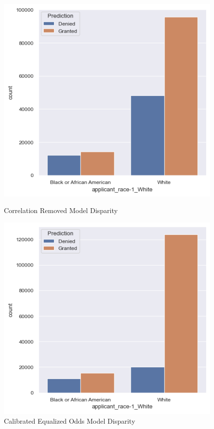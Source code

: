 \begin{figure}[h]
    \vspace{1em} %
    
    \begin{minipage}{0.5\textwidth}
        \centering
        \includegraphics[width=\textwidth]{images/loan_grants_by_protected_attributes/correlation_removed.png}
        \caption{Correlation Removed Model Disparity}
        \label{fig:Correlation_Removed_Disparity}
    \end{minipage}\hfill
    \begin{minipage}{0.5\textwidth}
        \centering
        \includegraphics[width=\textwidth]{images/loan_grants_by_protected_attributes/calibrated_eqodds.png} 
        \caption{Calibrated Equalized Odds Model Disparity}
        \label{fig:Calibrated_EqOdds_Disparity}
    \end{minipage}
    

\end{figure}
